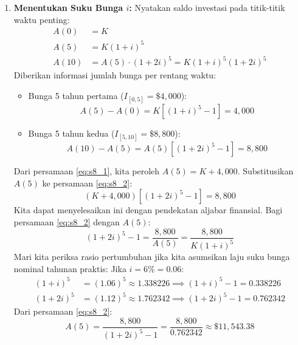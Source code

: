 \documentclass[11pt,a4paper]{article}
\begin{document}
\begin{solutionbox}[Soal 8]
\begin{enumerate}[label=(\alph*)]
    \item \textbf{Menentukan Suku Bunga $i$:}
    Nyatakan saldo investasi pada titik-titik waktu penting:
    \begin{align*}
        A(0) &= K \\
        A(5) &= K(1 + i)^5 \\
        A(10) &= A(5) \cdot (1 + 2i)^5 = K(1 + i)^5 (1 + 2i)^5
    \end{align*}
    Diberikan informasi jumlah bunga per rentang waktu:
    \begin{itemize}
        \item Bunga 5 tahun pertama ($I_{[0,5]} = \$4{,}000$):
        \begin{equation}
            A(5) - A(0) = K\left[(1 + i)^5 - 1\right] = 4{,}000 \label{eq:s8_1} \tag{1}
        \end{equation}
        \item Bunga 5 tahun kedua ($I_{[5,10]} = \$8{,}800$):
        \begin{equation}
            A(10) - A(5) = A(5)\left[(1 + 2i)^5 - 1\right] = 8{,}800 \label{eq:s8_2} \tag{2}
        \end{equation}
    \end{itemize}
    Dari persamaan \eqref{eq:s8_1}, kita peroleh $A(5) = K + 4{,}000$.
    Substitusikan $A(5)$ ke persamaan \eqref{eq:s8_2}:
    \begin{equation*}
        (K + 4{,}000)\left[(1 + 2i)^5 - 1\right] = 8{,}800
    \end{equation*}
    Kita dapat menyelesaikan ini dengan pendekatan aljabar finansial. Bagi persamaan \eqref{eq:s8_2} dengan $A(5)$:
    \begin{equation*}
        (1 + 2i)^5 - 1 = \frac{8{,}800}{A(5)} = \frac{8{,}800}{K(1+i)^5}
    \end{equation*}
    Mari kita periksa rasio pertumbuhan jika kita asumsikan laju suku bunga nominal tahunan praktis:
    Jika $i = 6\% = 0.06$:
    \begin{align*}
        (1 + i)^5 &= (1.06)^5 \approx 1.338226 \implies (1+i)^5 - 1 = 0.338226 \\
        (1 + 2i)^5 &= (1.12)^5 \approx 1.762342 \implies (1+2i)^5 - 1 = 0.762342
    \end{align*}
    Dari persamaan \eqref{eq:s8_2}:
    \begin{equation*}
        A(5) = \frac{8{,}800}{(1+2i)^5 - 1} = \frac{8{,}800}{0.762342} \approx \$11{,}543.38

\end{equation*}
\end{enumerate}
\end{solutionbox}
\end{document}
